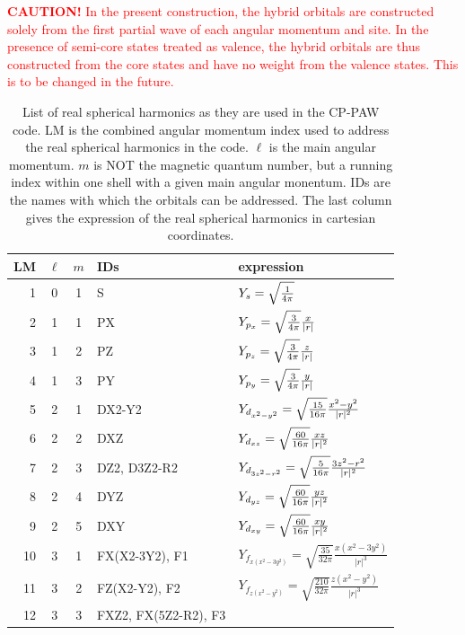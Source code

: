 \documentclass[final,12pt]{article}
\begin{document}
{{{{{{\textcolor{red}{\textbf{CAUTION!} In the present construction, the
  hybrid orbitals are constructed solely from the first partial wave
  of each angular momentum and site. In the presence of semi-core
  states treated as valence, the hybrid orbitals are thus constructed
  from the core states and have no weight from the valence
  states. This is to be changed in the future.}


\begin{table}[!hbt]
\caption{\label{tab:realsphericalharmonics}List of real spherical
  harmonics as they are used in the CP-PAW code. LM is the combined
  angular momentum index used to address the real spherical harmonics
  in the code. $\ell$ is the main angular momentum. $m$ is NOT the
  magnetic quantum number, but a running index within one shell with a
  given main angular monentum. IDs are the names with which the
  orbitals can be addressed. The last column gives the expression of
  the real spherical harmonics in cartesian coordinates.}
\begin{center}
\begin{tabular}{|r|c|c|l|l|}
\hline
LM & $\ell$ & $m$ & IDs & expression \\
\hline
1 & 0 & 1 & S   & $Y_s=\sqrt{1\over{4\pi}}$ \\
\hline
2 & 1 & 1 & PX  & $Y_{p_x}=\sqrt{3\over{4\pi}} {x\over{|r|}}$\\
3 & 1 & 2 & PZ  & $Y_{p_z}=\sqrt{3\over{4\pi}} {z\over{|r|}}$\\
4 & 1 & 3 & PY  & $Y_{p_y}=\sqrt{3\over{4\pi}} {y\over{|r|}}$\\
\hline
5 & 2 & 1  & DX2-Y2
                & $Y_{d_{x^2-y^2}}=\sqrt{15\over{16\pi}} {{x^2-y^2}\over{|r|^2}}$\\
6 & 2 & 2 & DXZ & $Y_{d_{xz}}=\sqrt{60\over{16\pi}} {{xz}\over{|r|^2}}$\\
7 & 2 & 3 & DZ2, D3Z2-R2 
                & $Y_{d_{3z^2-r^2}}=\sqrt{5\over{16\pi}} {{3z^2-r^2}\over{|r|^2}}$\\
8 & 2 & 4 & DYZ & $Y_{d_{yz}}=\sqrt{60\over{16\pi}} {{yz}\over{|r|^2}}$\\
9 & 2 & 5 & DXY & $Y_{d_{xy}}=\sqrt{60\over{16\pi}} {{xy}\over{|r|^2}}$\\
\hline
10 & 3 & 1 & FX(X2-3Y2), F1 
   & $Y_{f_{x(x^2-3y^2)}}=\sqrt{\frac{35}{32\pi}} \frac{x(x^2-3y^2)}{|r|^3}$\\
11 & 3 & 2 & FZ(X2-Y2), F2
   & $Y_{f_{z(x^2-y^2)}}=\sqrt{\frac{210}{32\pi}} \frac{z(x^2-y^2)}{|r|^3}$\\
12 & 3 & 3 & FXZ2, FX(5Z2-R2), F3 

\end{tabular}
\end{center}
\end{table}}}}}}}
\end{document}

